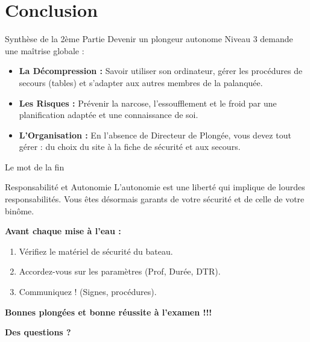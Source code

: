 \section{Conclusion}

\begin{frame}{Synthèse de la 2ème Partie}
    Devenir un plongeur autonome Niveau 3 demande une maîtrise globale :
    
    \begin{itemize}
        \item \textbf{La Décompression :} Savoir utiliser son ordinateur, gérer les procédures de secours (tables) et s'adapter aux autres membres de la palanquée.
        \item \textbf{Les Risques :} Prévenir la narcose, l'essoufflement et le froid par une planification adaptée et une connaissance de soi.
        \item \textbf{L'Organisation :} En l'absence de Directeur de Plongée, vous devez tout gérer : du choix du site à la fiche de sécurité et aux secours.
    \end{itemize}
\end{frame}

\begin{frame}{Le mot de la fin}
    \begin{block}{Responsabilité et Autonomie}
        L'autonomie est une liberté qui implique de lourdes responsabilités. Vous êtes désormais garants de votre sécurité et de celle de votre binôme.
    \end{block}

    \vspace{0.5cm}
    \textbf{Avant chaque mise à l'eau :}
    \begin{enumerate}
        \item Vérifiez le matériel de sécurité du bateau.
        \item Accordez-vous sur les paramètres (Prof, Durée, DTR).
        \item Communiquez ! (Signes, procédures).
    \end{enumerate}

    \begin{center}
        \vfill
        \Large \textbf{Bonnes plongées et bonne réussite à l'examen !!!}
    \end{center}
\end{frame}

\begin{frame}
    \centering
    \Huge \textbf{Des questions ?}
\end{frame}